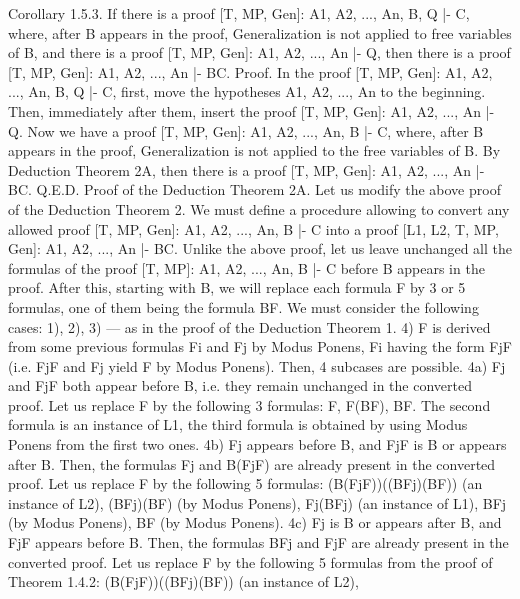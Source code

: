 Corollary 1.5.3. If there is a proof [T, MP, Gen]: A1, A2, ..., An, B, Q |- C, where, after B appears in the
proof, Generalization is not applied to free variables of B, and there is a proof [T, MP, Gen]: A1, A2, ...,
An |- Q, then there is a proof [T, MP, Gen]: A1, A2, ..., An |- B\IMPLIES C.
Proof. In the proof [T, MP, Gen]: A1, A2, ..., An, B, Q |- C, first, move the hypotheses A1, A2, ..., An to the
beginning. Then, immediately after them, insert the proof [T, MP, Gen]: A1, A2, ..., An |- Q. Now we have
a proof [T, MP, Gen]: A1, A2, ..., An, B |- C, where, after B appears in the proof, Generalization is not
applied to the free variables of B. By Deduction Theorem 2A, then there is a proof [T, MP, Gen]: A1,
A2, ..., An |- B\IMPLIES C. Q.E.D.
Proof of the Deduction Theorem 2A. Let us modify the above proof of the Deduction Theorem 2.
We must define a procedure allowing to convert any allowed proof [T, MP, Gen]: A1, A2, ..., An, B |- C
into a proof [L1, L2, T, MP, Gen]: A1, A2, ..., An |- B\IMPLIES C.
Unlike the above proof, let us leave unchanged all the formulas of the proof [T, MP]: A1, A2, ..., An, B |-
C before B appears in the proof. After this, starting with B, we will replace each formula F by 3 or 5
formulas, one of them being the formula B\IMPLIES F.
We must consider the following cases:
1), 2), 3) --- as in the proof of the Deduction Theorem 1.
4) F is derived from some previous formulas Fi and Fj by Modus Ponens, Fi having the form Fj\IMPLIES F (i.e.
Fj\IMPLIES F and Fj yield F by Modus Ponens). Then, 4 subcases are possible.
4a) Fj and Fj\IMPLIES F both appear before B, i.e. they remain unchanged in the converted proof. Let us replace
F by the following 3 formulas: F, F\IMPLIES (B\IMPLIES F), B\IMPLIES F. The second formula is an instance of L1, the third
formula is obtained by using Modus Ponens from the first two ones.
4b) Fj appears before B, and Fj\IMPLIES F is B or appears after B. Then, the formulas Fj and B\IMPLIES (Fj\IMPLIES F) are
already present in the converted proof. Let us replace F by the following 5 formulas:
(B\IMPLIES (Fj\IMPLIES F))\IMPLIES ((B\IMPLIES Fj)\IMPLIES (B\IMPLIES F)) (an instance of L2),
(B\IMPLIES Fj)\IMPLIES (B\IMPLIES F) (by Modus Ponens),
Fj\IMPLIES (B\IMPLIES Fj) (an instance of L1),
B\IMPLIES Fj (by Modus Ponens),
B\IMPLIES F (by Modus Ponens).
4c) Fj is B or appears after B, and Fj\IMPLIES F appears before B. Then, the formulas B\IMPLIES Fj and Fj\IMPLIES F are
already present in the converted proof. Let us replace F by the following 5 formulas from the proof of
Theorem 1.4.2:
(B\IMPLIES (Fj\IMPLIES F))\IMPLIES ((B\IMPLIES Fj)\IMPLIES (B\IMPLIES F)) (an instance of L2),
